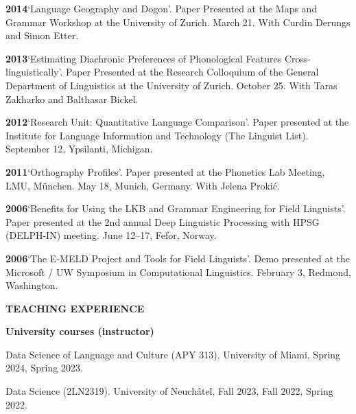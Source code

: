 \documentclass[11pt]{article}
\newcommand{\hangpara}{
 \setlength{\parindent}{0in} %
 \hangindent=0.42in %
}
\begin{document}
\vskip 6pt
\hangpara
{\bf 2014}\hspace{1ex}`Language Geography and Dogon'. Paper Presented at the Maps and Grammar Workshop at the University of Zurich. March 21. With Curdin Derungs and Simon Etter.

\vskip 6pt
\hangpara
{\bf 2013}\hspace{1ex}`Estimating Diachronic Preferences of Phonological Features Cross-linguistically'. Paper Presented at the Research Colloquium of the General Department of Linguistics at the University of Zurich. October 25. With Taras Zakharko and Balthasar Bickel.

\vskip 6pt
\hangpara
{\bf 2012}\hspace{1ex}`Research Unit: Quantitative Language Comparison'. Paper presented at the Institute for Language Information and Technology (The Linguist List). September 12, Ypsilanti, Michigan.

\vskip 6pt
\hangpara
{\bf 2011}\hspace{1ex}`Orthography Profiles'. Paper presented at the Phonetics Lab Meeting, LMU, M{\"u}nchen. May 18, Munich, Germany. With Jelena Proki{\'c}.

\vskip 6pt
\hangpara
{\bf 2006}\hspace{1ex}`Benefits for Using the LKB and Grammar Engineering for Field Linguists'. Paper presented at the 2nd annual Deep Linguistic Processing with HPSG (DELPH-IN) meeting. June 12--17, Fefor, Norway.

\vskip 6pt
\hangpara
{\bf 2006}\hspace{1ex}`The E-MELD Project and Tools for Field Linguists'. Demo presented at the Microsoft / UW Symposium in Computational Linguistics. February 3, Redmond, Washington.

\vskip 20pt
\begin{flushleft}
{\bf TEACHING EXPERIENCE}
\end{flushleft}

\begin{flushleft}
{\bf University courses (instructor)}
\end{flushleft}


\hangpara Data Science of Language and Culture (APY 313). University of Miami, Spring 2024, Spring 2023.

\vskip 6pt
\hangpara Data Science (2LN2319). University of Neuchâtel, Fall 2023, Fall 2022, Spring 2022.
\end{document}
